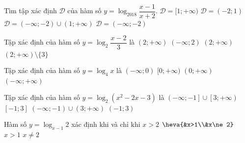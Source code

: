 \begin{ex}%
	Tìm tập xác định $\mathscr{D}$ của hàm  số $y=\log _{2018} \dfrac{x-1}{x+2}$.
	\choice 
		{$\mathscr{D}=[1; +  \infty)$}
		{$\mathscr{D}=( -  2; 1)$}
		{\True $\mathscr{D}=( - \infty; - 2)\cup(1;  + \infty)$}
		{$\mathscr{D}=( - \infty;  - 2)$}
\end{ex}

\begin{ex}%
	Tập  xác định của hàm số $y=\log_2\dfrac{x-2}{3}$ là
	 \choice
		{\True $(2;+\infty)$} 
		 {$(-\infty;2)$}
		 {$(2;+\infty)$}
		{$(2;+\infty)\setminus \{3\}$} 
\end{ex}

\begin{ex}%
	Tập xác  định của hàm số $y=\log _4x$ là
	\choice 
		 {$(-\infty; 0)$}
		{$[0;+\infty)$} 
		 {\True $(0;+\infty)$}
		 {$(-\infty;+\infty)$}
\end{ex}

\begin{ex}%
	Tập xác  định của hàm số $y=\log_2 \left(x^2-2x-3\right)$ là
	\choice 
		{$\left( -\infty;-1 \right]\cup \left[3;+\infty \right)$} 
		{$\left[-1;3  \right]$}
		{\True $\left(  -\infty;-1 \right)\cup \left( 3;+\infty \right)$}
		{$\left(  -1;3\right)$}
\end{ex}

\begin{ex}%
	Hàm số $y=\log_{x-1}2$ xác  định khi và chỉ khi
	 \choice
		{$x>2$} 
		{\True  $\heva{&x>1\\&x\ne 2}$}
		 {$x>1$}
		 {$x\ne 2$}
\end{ex}

